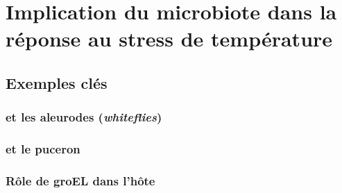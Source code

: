 \chapter{Implication du microbiote dans la réponse au stress de température} %
\label{sec:implicationµbiote}
	
	\section{Exemples clés} %
	\label{sec:exemples}
		

		\subsection{ et les aleurodes (\textit{whiteflies})} %
		\label{sub:rickettsia_et_les_aleurodes_}
			

		\subsection{ et le puceron} %
		\label{sub:exemple_buchnera}
			

		\subsection{Rôle de groEL dans l'hôte } %
		\label{sub:groel}
			

	